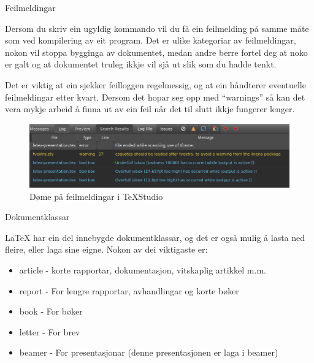 	\begin{frame}{Feilmeldingar}
		
		Dersom du skriv ein ugyldig kommando vil du få ein feilmelding på samme måte som ved kompilering av eit program. Det er ulike kategoriar av feilmeldingar, nokon vil stoppa bygginga av dokumentet, medan andre berre fortel deg at noko er galt og at dokumentet truleg ikkje vil sjå ut slik som du hadde tenkt.
		
		
		Det er viktig at ein sjekker feilloggen regelmessig, og at ein håndterer eventuelle feilmeldingar etter kvart. Dersom det hopar seg opp med ``warnings'' så kan det vera mykje arbeid å finna ut av ein feil når det til slutt ikkje fungerer lenger.
		
		\begin{figure}
			\centering
			\includegraphics[width=0.9\linewidth]{img/latex-error-example}
			\caption{Døme på feilmeldingar i TeXStudio}
			\label{fig:latex-error-example}
		\end{figure}
		
		
	\end{frame}
	
	\begin{frame}{Dokumentklassar}
		
		\LaTeX{} har ein del innebygde dokumentklassar, og det er også mulig å lasta ned fleire, eller laga sine eigne. Nokon av dei viktigaste er:
		
		\begin{itemize}
			\item article - korte rapportar, dokumentasjon, vitskaplig artikkel m.m.
			\item report - For lengre rapportar, avhandlingar og korte bøker
			\item book - For bøker
			\item letter - For brev
			\item beamer - For presentasjonar (denne presentasjonen er laga i beamer)
		\end{itemize}
		
	\end{frame}




